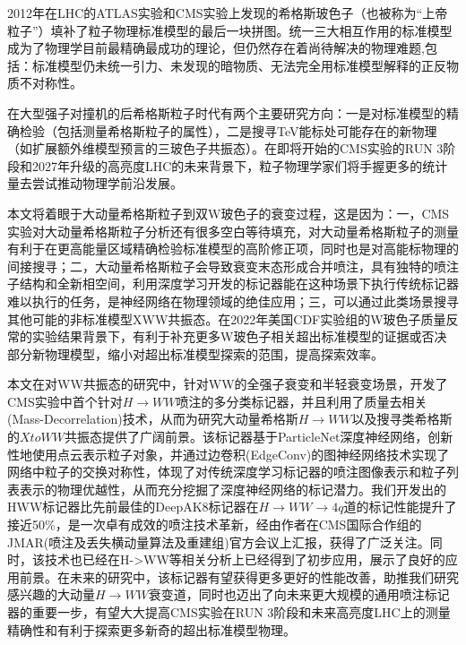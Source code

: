 \begin{cabstract}
    \kaishu
	2012年在LHC的ATLAS实验和CMS实验上发现的希格斯玻色子（也被称为“上帝粒子”）填补了粒子物理标准模型的最后一块拼图。统一三大相互作用的标准模型成为了物理学目前最精确最成功的理论，但仍然存在着尚待解决的物理难题,包括：标准模型仍未统一引力、未发现的暗物质、无法完全用标准模型解释的正反物质不对称性。
	
	在大型强子对撞机的后希格斯粒子时代有两个主要研究方向：一是对标准模型的精确检验（包括测量希格斯粒子的属性），二是搜寻TeV能标处可能存在的新物理（如扩展额外维模型预言的三玻色子共振态）。在即将开始的CMS实验的RUN 3阶段和2027年升级的高亮度LHC的未来背景下，粒子物理学家们将手握更多的统计量去尝试推动物理学前沿发展。
	
	本文将着眼于大动量希格斯粒子到双W玻色子的衰变过程，这是因为：一，CMS实验对大动量希格斯粒子分析还有很多空白等待填充，对大动量希格斯粒子的测量有利于在更高能量区域精确检验标准模型的高阶修正项，同时也是对高能标物理的间接搜寻；二，大动量希格斯粒子会导致衰变末态形成合并喷注，具有独特的喷注子结构和全新相空间，利用深度学习开发的标记器能在这种场景下执行传统标记器难以执行的任务，是神经网络在物理领域的绝佳应用；三，可以通过此类场景搜寻其他可能的非标准模型XWW共振态。在2022年美国CDF实验组的W玻色子质量反常的实验结果背景下，有利于补充更多W玻色子相关超出标准模型的证据或否决部分新物理模型，缩小对超出标准模型探索的范围，提高探索效率。
	
	本文在对WW共振态的研究中，针对WW的全强子衰变和半轻衰变场景，开发了CMS实验中首个针对$H\to WW$喷注的多分类标记器，并且利用了质量去相关(Mass-Decorrelation)技术，从而为研究大动量希格斯$H\to WW$以及搜寻类希格斯的$Xto WW$共振态提供了广阔前景。该标记器基于ParticleNet深度神经网络，创新性地使用点云表示粒子对象，并通过边卷积(EdgeConv)的图神经网络技术实现了网络中粒子的交换对称性，体现了对传统深度学习标记器的喷注图像表示和粒子列表表示的物理优越性，从而充分挖掘了深度神经网络的标记潜力。我们开发出的HWW标记器比先前最佳的DeepAK8标记器在$H\to WW\to 4q$道的标记性能提升了接近50\%，是一次卓有成效的喷注技术革新，经由作者在CMS国际合作组的JMAR(喷注及丢失横动量算法及重建组)官方会议上汇报，获得了广泛关注。同时，该技术也已经在H->WW等相关分析上已经得到了初步应用，展示了良好的应用前景。在未来的研究中，该标记器有望获得更多更好的性能改善，助推我们研究感兴趣的大动量$H\to WW$衰变道，同时也迈出了向未来更大规模的通用喷注标记器的重要一步，有望大大提高CMS实验在RUN 3阶段和未来高亮度LHC上的测量精确性和有利于探索更多新奇的超出标准模型物理。
\end{cabstract}

